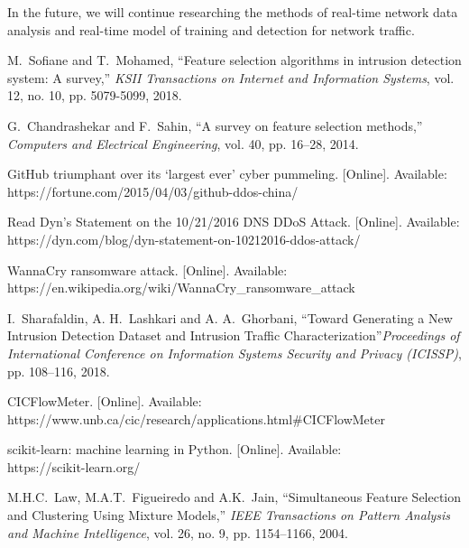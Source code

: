\documentclass{ieeeaccess}
\theoremstyle{definition}
\begin{document}
In the future, we will continue researching the methods of real-time network data analysis and real-time model of training and detection for network traffic.

% 
\begin{thebibliography}{1}

    M.~Sofiane and T.~Mohamed, ``Feature selection algorithms in intrusion detection system: A survey,'' \emph{KSII Transactions on Internet and Information Systems}, vol. 12, no. 10, pp. 5079-5099, 2018.

    G.~Chandrashekar and F.~Sahin, ``A survey on feature selection methods,'' \emph{Computers and Electrical Engineering}, vol. 40, pp. 16--28, 2014.

    GitHub triumphant over its ‘largest ever’ cyber pummeling. [Online]. Available: \\ https://fortune.com/2015/04/03/github-ddos-china/

    Read Dyn’s Statement on the 10/21/2016 DNS DDoS Attack. [Online]. Available: \\ https://dyn.com/blog/dyn-statement-on-10212016-ddos-attack/

    WannaCry ransomware attack. [Online]. Available: \\ https://en.wikipedia.org/wiki/WannaCry\_ransomware\_attack

    I.~Sharafaldin, A. H.~Lashkari and A. A.~Ghorbani, ``Toward Generating a New Intrusion Detection Dataset and Intrusion Traffic Characterization''\emph{Proceedings of International Conference on Information Systems Security and Privacy (ICISSP)}, pp. 108--116, 2018.

    CICFlowMeter. [Online]. Available: \\ https://www.unb.ca/cic/research/applications.html\#CICFlowMeter

    scikit-learn: machine learning in Python. [Online]. Available: \\ https://scikit-learn.org/

    M.H.C.~Law, M.A.T.~Figueiredo and A.K.~Jain, ``Simultaneous Feature Selection and Clustering Using Mixture Models,'' \emph{IEEE Transactions on Pattern Analysis and Machine Intelligence}, vol. 26, no. 9, pp. 1154--1166, 2004.


\end{thebibliography}
\end{document}
